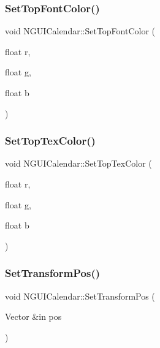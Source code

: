 \hypertarget{class_n_g_u_i_calendar_aa86bd5e746ddf4bd0c4be93d30de5e0e}{}\label{class_n_g_u_i_calendar_aa86bd5e746ddf4bd0c4be93d30de5e0e} 
\subsubsection{\texorpdfstring{Set\+Top\+Font\+Color()}{SetTopFontColor()}}
{\footnotesize\ttfamily void N\+G\+U\+I\+Calendar\+::\+Set\+Top\+Font\+Color (\begin{DoxyParamCaption}\item[{float}]{r,  }\item[{float}]{g,  }\item[{float}]{b }\end{DoxyParamCaption})}

\hypertarget{class_n_g_u_i_calendar_a972a6e93be5d579453e4c5b4ec63dccb}{}\label{class_n_g_u_i_calendar_a972a6e93be5d579453e4c5b4ec63dccb} 
\subsubsection{\texorpdfstring{Set\+Top\+Tex\+Color()}{SetTopTexColor()}}
{\footnotesize\ttfamily void N\+G\+U\+I\+Calendar\+::\+Set\+Top\+Tex\+Color (\begin{DoxyParamCaption}\item[{float}]{r,  }\item[{float}]{g,  }\item[{float}]{b }\end{DoxyParamCaption})}

\hypertarget{class_n_g_u_i_calendar_a4463bd24207cc6f2c76bd4433d2cd946}{}\label{class_n_g_u_i_calendar_a4463bd24207cc6f2c76bd4433d2cd946} 
\subsubsection{\texorpdfstring{Set\+Transform\+Pos()}{SetTransformPos()}}
{\footnotesize\ttfamily void N\+G\+U\+I\+Calendar\+::\+Set\+Transform\+Pos (\begin{DoxyParamCaption}\item[{Vector \&in}]{pos }\end{DoxyParamCaption})}

